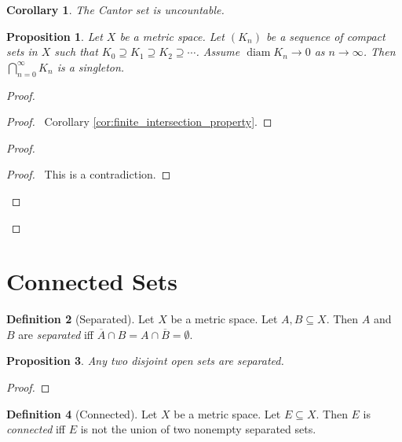 \documentclass{book}
\let\qed\relax
\newtheorem{prop}{Proposition}[chapter]
\newtheorem{cor}{Corollary}[prop]
\theoremstyle{definition}
\newtheorem{df}[prop]{Definition}
\newcommand{\diam}{\ensuremath{\operatorname{diam}}}
\begin{document}
\begin{cor}
The Cantor set is uncountable.
\end{cor}

\begin{prop}
\label{prop:nested_sequence_of_compact_sets}
Let $X$ be a metric space. Let $(K_n)$ be a sequence of compact sets in $X$ such that $K_0 \supseteq K_1 \supseteq K_2 \supseteq \cdots$. Assume $\diam K_n \rightarrow 0$ as $n \rightarrow \infty$. Then $\bigcap_{n=0}^\infty K_n$ is a singleton.
\end{prop}

\begin{proof}
\pf
{}
\begin{proof}
\pf\ Corollary \ref{cor:finite_intersection_property}.
\end{proof}
\begin{proof}
	\step{c}{\pick\ $n$ such that $\diam K_n < \epsilon$}
	\qedstep
	\begin{proof}
		\pf\ This is a contradiction.
	\end{proof}
\end{proof}
\qed
\end{proof}

\section{Connected Sets}

\begin{df}[Separated]
Let $X$ be a metric space. Let $A,B \subseteq X$. Then $A$ and $B$ are \emph{separated} iff $\overline{A} \cap B = A \cap \overline{B} = \emptyset$.
\end{df}

\begin{prop}
Any two disjoint open sets are separated.
\end{prop}

\begin{proof}
\pf
{}
\qed
\end{proof}

\begin{df}[Connected]
Let $X$ be a metric space. Let $E \subseteq X$. Then $E$ is \emph{connected} iff $E$ is not the union of two nonempty separated sets.
\end{df}
\end{document}
